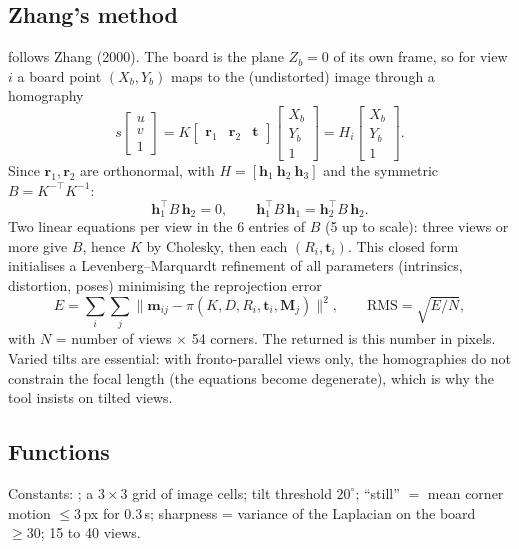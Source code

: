 \subsection{Zhang's method}

 follows Zhang (2000). The board is the plane $Z_b = 0$ of its own frame, so for view
$i$ a board point $(X_b, Y_b)$ maps to the (undistorted) image through a homography
$$
s\begin{bmatrix} u \\ v \\ 1\end{bmatrix} = K\begin{bmatrix} \mathbf r_1 & \mathbf r_2 & \mathbf t\end{bmatrix}
\begin{bmatrix} X_b \\ Y_b \\ 1\end{bmatrix} = H_i \begin{bmatrix} X_b \\ Y_b \\ 1\end{bmatrix}.
$$
Since $\mathbf r_1, \mathbf r_2$ are orthonormal, with $H = [\mathbf h_1\ \mathbf h_2\ \mathbf h_3]$ and the symmetric
$B = K^{-\top}K^{-1}$:
$$
\mathbf h_1^\top B\,\mathbf h_2 = 0, \qquad \mathbf h_1^\top B\,\mathbf h_1 = \mathbf h_2^\top B\,\mathbf h_2 .
$$
Two linear equations per view in the 6 entries of $B$ (5 up to scale): three views or more give $B$, hence $K$ by
Cholesky, then each $(R_i, \mathbf t_i)$. This closed form initialises a Levenberg--Marquardt refinement of all
parameters (intrinsics, distortion, poses) minimising the reprojection error
$$
E = \sum_{i}\sum_{j} \big\lVert \mathbf m_{ij} - \pi(K, D, R_i, \mathbf t_i, \mathbf M_j)\big\rVert^2 ,
\qquad \text{RMS} = \sqrt{E / N},
$$
with $N$ = number of views $\times$ 54 corners. The returned  is this number in pixels. Varied tilts
are essential: with fronto-parallel views only, the homographies do not constrain the focal length (the
equations become degenerate), which is why the tool insists on tilted views.

\subsection{Functions}

Constants: ; a $3\times3$ grid of image cells; tilt threshold $20^\circ$;
``still'' $= $ mean corner motion $\le 3$\,px for 0.3\,s; sharpness = variance of the Laplacian on the board
$\ge 30$; 15 to 40 views.

